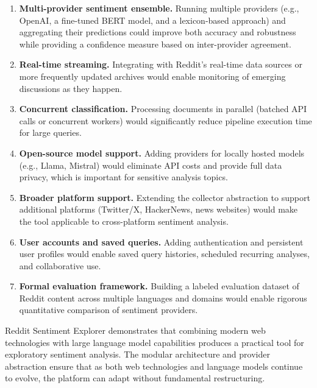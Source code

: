 \begin{enumerate}
    \item \textbf{Multi-provider sentiment ensemble.} Running multiple providers (e.g., OpenAI, a fine-tuned BERT model, and a lexicon-based approach) and aggregating their predictions could improve both accuracy and robustness while providing a confidence measure based on inter-provider agreement.

    \item \textbf{Real-time streaming.} Integrating with Reddit's real-time data sources or more frequently updated archives would enable monitoring of emerging discussions as they happen.

    \item \textbf{Concurrent classification.} Processing documents in parallel (batched API calls or concurrent workers) would significantly reduce pipeline execution time for large queries.

    \item \textbf{Open-source model support.} Adding providers for locally hosted models (e.g., Llama, Mistral) would eliminate API costs and provide full data privacy, which is important for sensitive analysis topics.

    \item \textbf{Broader platform support.} Extending the collector abstraction to support additional platforms (Twitter/X, HackerNews, news websites) would make the tool applicable to cross-platform sentiment analysis.

    \item \textbf{User accounts and saved queries.} Adding authentication and persistent user profiles would enable saved query histories, scheduled recurring analyses, and collaborative use.

    \item \textbf{Formal evaluation framework.} Building a labeled evaluation dataset of Reddit content across multiple languages and domains would enable rigorous quantitative comparison of sentiment providers.
\end{enumerate}

Reddit Sentiment Explorer demonstrates that combining modern web technologies with large language model capabilities produces a practical tool for exploratory sentiment analysis. The modular architecture and provider abstraction ensure that as both web technologies and language models continue to evolve, the platform can adapt without fundamental restructuring.
